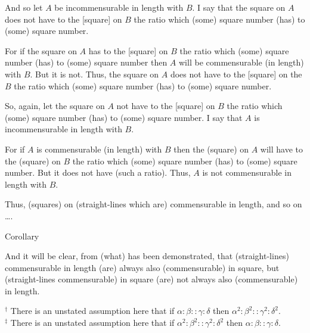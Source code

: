\begin{Parallel}{}{}
{And so let $A$ be incommensurable in length with $B$. I say that
 the square on $A$ does not have to the [square] on $B$ the ratio
which (some) square number (has) to (some) square number.

For if the square on $A$ has to the [square] on $B$ the ratio which
(some) square number (has) to (some) square number then $A$
will be commensurable (in length) with $B$. But it is not. Thus, the square on $A$
does not have to the [square] on the $B$ the ratio which (some)
square number (has) to (some) square number.

So, again, let the square on $A$ not have to the [square] on $B$
the ratio which (some) square number (has) to (some) square number.
I say that $A$ is incommensurable in length with $B$.

For if $A$ is commensurable (in length) with $B$ then  the 
(square) on $A$ will have to the (square) on $B$ the ratio which (some) square
number (has) to (some) square number. But it does not have (such a ratio). 
Thus, $A$ is not commensurable in length with $B$.

Thus, (squares) on (straight-lines which are) commensurable in length,
and so on \ldots.\\

\begin{center}
{\large Corollary}
\end{center}\vspace*{-7pt}

And it will be clear, from (what) has been demonstrated, that (straight-lines)
commensurable in length (are) always also (commensurable) in square, 
but (straight-lines commensurable) in square (are) not always also (commensurable)
in length.}
\end{Parallel}
{\footnotesize\noindent$^\dag$ There is an unstated assumption here that if $\alpha:\beta::\gamma:\delta$ then $\alpha^2:\beta^2::\gamma^2:\delta^2$.\\[0.5ex]
$^\ddag$ There is an unstated
assumption here that if $\alpha^2:\beta^2::\gamma^2:\delta^2$ then $\alpha:\beta::\gamma:\delta$.}

